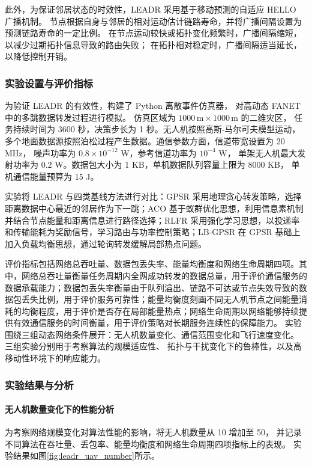 此外，为保证邻居状态的时效性，LEADR 采用基于移动预测的自适应 HELLO 广播机制。
节点根据自身与邻居的相对运动估计链路寿命，并将广播间隔设置为预测链路寿命的一定比例。
在节点运动较快或拓扑变化频繁时，广播间隔缩短，以减少过期拓扑信息导致的路由失败；
在拓扑相对稳定时，广播间隔适当延长，以降低控制开销。
\subsubsection{实验设置与评价指标}
为验证 LEADR 的有效性，构建了 Python 离散事件仿真器，
对高动态 FANET 中的多跳数据转发过程进行模拟。
仿真区域为 $1000\,\mathrm{m}\times1000\,\mathrm{m}$ 的二维灾区，
任务持续时间为 3600 秒，决策步长为 1 秒。无人机按照高斯-马尔可夫模型运动，
多个地面数据源按照泊松过程产生数据。通信参数方面，信道带宽设置为 20 MHz，
噪声功率为 $0.8\times10^{-12}$ W，参考信道功率为 $10^{-4}$ W，
单架无人机最大发射功率为 0.2 W。数据包大小为 1 KB，单机数据队列容量上限为 8000 KB，
单机通信能量预算为 15 J。

实验将 LEADR 与四类基线方法进行对比：GPSR 采用地理贪心转发策略，选择距离数据中心最近的邻居作为下一跳；ACO 基于蚁群优化思想，利用信息素机制并结合节点能量和距离信息进行路径选择；RLFR 采用强化学习思想，以投递率和传输能耗为奖励信号，学习路由与功率控制策略；LB-GPSR 在 GPSR 基础上加入负载均衡思想，通过轮询转发缓解局部热点问题。

评价指标包括网络总吞吐量、数据包丢失率、能量均衡度和网络生命周期四项。其中，网络总吞吐量衡量任务周期内全网成功转发的数据总量，用于评价通信服务的数据承载能力；数据包丢失率衡量由于队列溢出、链路不可达或节点失效导致的数据包丢失比例，用于评价服务可靠性；能量均衡度刻画不同无人机节点之间能量消耗的均衡程度，用于评价是否存在局部能量热点；网络生命周期以网络能够持续提供有效通信服务的时间衡量，用于评价策略对长期服务连续性的保障能力。
实验围绕三组动态网络条件展开：无人机数量变化、通信范围变化和飞行速度变化。
三组实验分别用于考察算法的规模适应性、
拓扑与干扰变化下的鲁棒性，以及高移动性环境下的响应能力。
\subsubsection{实验结果与分析}
\paragraph{无人机数量变化下的性能分析}

为考察网络规模变化对算法性能的影响，将无人机数量从 10 增加至 50，
并记录不同算法在吞吐量、丢包率、能量均衡度和网络生命周期四项指标上的表现。
实验结果如图\ref{fig:leadr_uav_number}所示。

